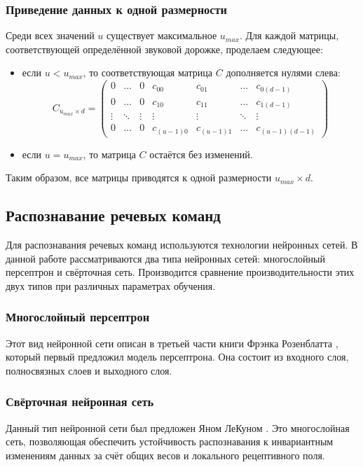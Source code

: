 \subsubsection{Приведение данных к одной размерности}
Среди всех значений $u$ существует максимальное $u_{max}$. Для каждой матрицы, соответствующей определённой звуковой дорожке, проделаем следующее:
\begin{itemize}[leftmargin=2cm]
	\item если $u < u_{max}$, то соответствующая матрица $C$ дополняется нулями слева:
	\begin{equation*}
		C_{u_{max} \times d} = \left(
		\begin{array}{ccccccc}
			0 & \ldots & 0 & c_{00} & c_{01} & \ldots & c_{0(d-1)}\\
			0 & \ldots & 0 & c_{10} &  c_{11} & \ldots & c_{1(d-1)}\\
			\vdots & \ddots & \vdots & \vdots & \vdots & \ddots & \vdots\\
			0 & \ldots & 0 & c_{(u-1)0} & c_{(u-1)1} & \ldots & c_{(u-1)(d-1)}
		\end{array}
		\right)
	\end{equation*}
	\item если $u = u_{max}$, то матрица $C$ остаётся без изменений.
\end{itemize}

Таким образом, все матрицы приводятся к одной размерности $u_{max} \times d$.

\subsection{Распознавание речевых команд}
Для распознавания речевых команд используются технологии нейронных сетей. В данной работе рассматриваются два типа нейронных сетей: многослойный персептрон и свёрточная сеть. Производится сравнение производительности этих двух типов при различных параметрах обучения.
\subsubsection{Многослойный персептрон}
Этот вид нейронной сети описан в третьей части книги Фрэнка Розенблатта \cite{PerceptronBook}, который первый предложил модель персептрона. Она состоит из входного слоя, полносвязных слоев и выходного слоя.
\subsubsection{Свёрточная нейронная сеть}
Данный тип нейронной сети был предложен Яном ЛеКуном \cite{CNN}. Это многослойная сеть, позволяющая обеспечить устойчивость распознавания к инвариантным изменениям данных за счёт общих весов и локального рецептивного поля.

